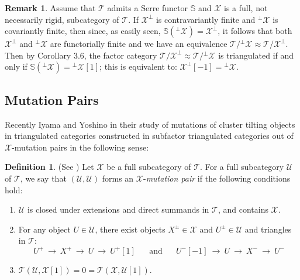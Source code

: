 \documentclass[oneside, a4paper,reqno]{amsart}
\numberwithin{equation}{section}
\theoremstyle{definition}
\newtheorem{defn}[thm]{Definition}
\newtheorem{rem}[thm]{Remark}
\begin{document}
\begin{rem} Assume that ${\mathcal T}$ admits a Serre functor $\mathbb S$ and ${\mathcal X}$ is a full, not necessarily rigid, subcategory of ${\mathcal T}$. If ${\mathcal X}^{\bot}$ is contravariantly finite and ${^{\bot}}{\mathcal X}$ is covariantly finite, then  since, as easily seen, $\mathbb S({^{\bot}}{\mathcal X}) = {\mathcal X}^{\bot}$, it follows that both ${\mathcal X}^{\bot}$ and ${^{\bot}}{\mathcal X}$ are functorially finite and we have an equivalence ${\mathcal T}/{^{\bot}}{\mathcal X} \approx {\mathcal T}/{\mathcal X}^{\bot}$. Then by Corollary $3.6$, the factor category ${\mathcal T}/{\mathcal X}^{\bot} \approx {\mathcal T}/{^{\bot}}{\mathcal X}$ is triangulated if and only if $\mathbb S({^{\bot}}{\mathcal X}) = {^{\bot}}{\mathcal X}[1]$; this is equivalent to: ${\mathcal X}^{\bot}[-1] = {^{\bot}}{\mathcal X}$.     
\end{rem} 

\subsection{Mutation Pairs} Recently Iyama and Yoshino in their study of mutations of cluster tilting objects in triangulated categories constructed in \cite[Theorem 4.2]{IY} subfactor triangulated categories out of  ${\mathcal X}$-mutation pairs in the following sense: 

\begin{defn} (See \cite[Sections 2 and 4]{IY}) Let ${\mathcal X}$ be a full subcategory of ${\mathcal T}$. For a full subcategory ${\mathcal U}$ of ${\mathcal T}$,  we say that $({\mathcal U},{\mathcal U})$ forms an ${\mathcal X}$-{\em mutation pair} if the following conditions hold:
\begin{enumerate}
\item ${\mathcal U}$ is closed under extensions and direct summands in ${\mathcal T}$, and contains ${\mathcal X}$. 
\item  For any object $U \in {\mathcal U}$, there exist objects $X^{\pm} \in {\mathcal X}$ and $U^{\pm} \in {\mathcal U}$ and  triangles in ${\mathcal T}$:
 \[ U^{+} \ {\longrightarrow} \  X^{+} \ {\longrightarrow} \ U \ {\longrightarrow} \ U^{+}[1] \,\,\,\,\,\,\,\,\,\, \text{and}  \,\,\,\,\,\,\,\,\,\, U^{-}[-1] \ {\longrightarrow} \ U \ {\longrightarrow} \ X^{-} \  {\longrightarrow} \ U^{-}  
 \]
\item ${\mathcal T}({\mathcal U},{\mathcal X}[1]) = 0 = {\mathcal T}({\mathcal X},{\mathcal U}[1])$.  
\end{enumerate} 
\end{defn} 
\end{document}

